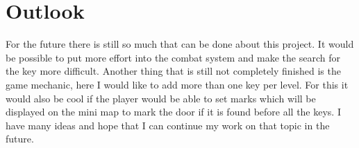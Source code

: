 \documentclass[a4paper,11pt,oneside]{scrreprt}
\begin{document}
\section{Outlook}
\label{section:outlook}
For the future there is still so much that can be done about this project. It would be possible to put more effort into the combat system and make the search for the key more difficult. Another thing that is still not completely finished is the game mechanic, here I would like to add more than one key per level. For this it would also be cool if the player would be able to set marks which will be displayed on the mini map to mark the door if it is found before all the keys. I have many ideas and hope that I can continue my work on that topic in the future.

\clearpage
{}
{}
\listoffigures

\clearpage
{}
{}
\listoflistings

\clearpage
{}
{}
\printbibliography
\end{document}
